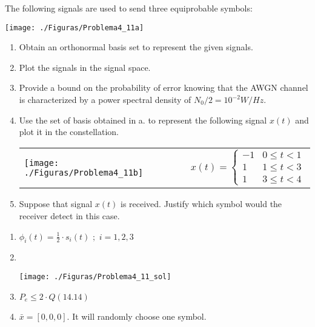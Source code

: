 \documentclass[es,boletin]{uah}
\begin{document}
{

	The following signals are used to send three equiprobable symbols: 
 
 \begin{figure*}[h!] 	\centering\texttt{[image: ./Figuras/Problema4\_11a]} 	\end{figure*}
	
	\begin{enumerate}
		\item Obtain an orthonormal basis set to represent the given signals. 
		\item Plot the signals in the signal space. 
		\item Provide a bound on the probability of error knowing that the AWGN channel is characterized by a power spectral density of $N_0/2 = 10^{-2}  W/Hz$. 
		\item Use the set of basis obtained in a. to represent the following signal $x(t)$ and plot it in the constellation. 
				\\
		\begin{tabular}{lr}
			\texttt{[image: ./Figuras/Problema4\_11b]} &
			\begin{math}
			x(t) = \left\{ \begin{array}{ll} -1 & 0\leq t < 1 \\ 1 & 1 \leq t < 3  \\ 1 & 3 \leq t < 4 \end{array} \right. 
			\end{math}  \\
		\end{tabular}
		\item Suppose that signal $x(t)$ is received. Justify which symbol would the receiver detect in this case. 
	\end{enumerate}

}
{
\begin{enumerate}
	\item $\phi_i(t) = \frac{1}{2} \cdot s_i(t) \,\, ; \, \, i=1,2,3$
	
	\item \ \\
	\begin{figure*}[h!] 	\centering\texttt{[image: ./Figuras/Problema4\_11\_sol]} 	\end{figure*}
	\item $P_e \leq 2 \cdot Q(14.14)$
	\item $\bar{x} = [0,0,0]$. It will randomly choose one symbol.
\end{enumerate}
}
\end{document}
